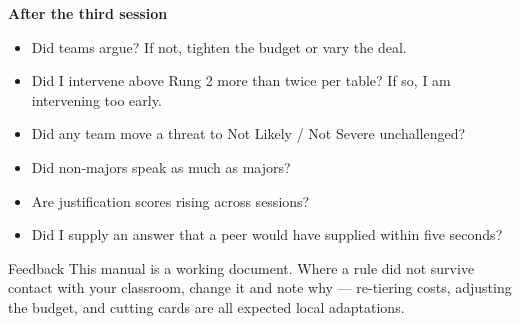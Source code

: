 \documentclass[11pt,letterpaper]{article}
\begin{document}
\vspace{0.6em}
\noindent\textbf{After the third session}
\begin{itemize}
\item[$\square$] Did teams argue? If not, tighten the budget or vary the deal.
\item[$\square$] Did I intervene above Rung 2 more than twice per table? If so, I
am intervening too early.
\item[$\square$] Did any team move a threat to Not Likely / Not Severe unchallenged?
\item[$\square$] Did non-majors speak as much as majors?
\item[$\square$] Are justification scores rising across sessions?
\item[$\square$] Did I supply an answer that a peer would have supplied within
five seconds?
\end{itemize}

\vspace{1.4em}
\begin{note}{Feedback}
This manual is a working document. Where a rule did not survive contact with
your classroom, change it and note why --- re-tiering costs, adjusting the
budget, and cutting cards are all expected local adaptations.
\end{note}
\end{document}
